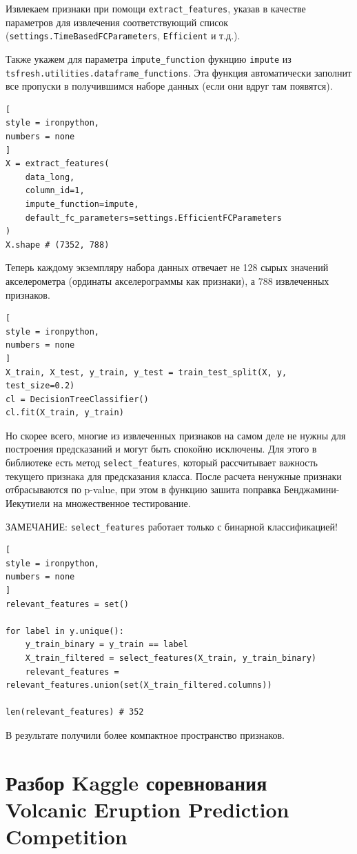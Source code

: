 \documentclass[%
	11pt,
	a4paper,
	utf8,
		]{article}
\begin{document}
Извлекаем признаки при помощи \texttt{extract\_features}, указав в качестве параметров для извлечения соответствующий список (\texttt{settings.TimeBasedFCParameters}, \texttt{Efficient} и т.д.).

Также укажем для параметра \texttt{impute\_function} фукнцию \texttt{impute} из \texttt{tsfresh.utilities.dataframe\_functions}. Эта функция автоматически заполнит все пропуски в получившимся наборе данных (если они вдруг там появятся).
\begin{lstlisting}[
style = ironpython,
numbers = none	
]
X = extract_features(
    data_long,
    column_id=1,
    impute_function=impute,
    default_fc_parameters=settings.EfficientFCParameters
)
X.shape # (7352, 788)
\end{lstlisting}

Теперь каждому экземпляру набора данных отвечает не 128 сырых значений акселерометра (ординаты акселерограммы как признаки), а 788 извлеченных признаков.
\begin{lstlisting}[
style = ironpython,
numbers = none	
]
X_train, X_test, y_train, y_test = train_test_split(X, y, test_size=0.2)
cl = DecisionTreeClassifier()
cl.fit(X_train, y_train)
\end{lstlisting}

Но скорее всего, многие из извлеченных признаков на самом деле не нужны для построения предсказаний и могут быть спокойно исключены. Для этого в библиотеке есть метод \texttt{select\_features}, который рассчитывает важность текущего признака для предсказания класса. После расчета ненужные признаки отбрасываются по p-value, при этом в функцию зашита поправка Бенджамини-Иекутиели на множественное тестирование.

ЗАМЕЧАНИЕ: \texttt{select\_features} работает только с бинарной классификацией!

\begin{lstlisting}[
style = ironpython,
numbers = none
]
relevant_features = set()

for label in y.unique():
    y_train_binary = y_train == label
    X_train_filtered = select_features(X_train, y_train_binary)
    relevant_features = relevant_features.union(set(X_train_filtered.columns))
    
len(relevant_features) # 352
\end{lstlisting}

В результате получили более компактное пространство признаков.

\section{Разбор Kaggle соревнования Volcanic Eruption Prediction Competition}
\end{document}
